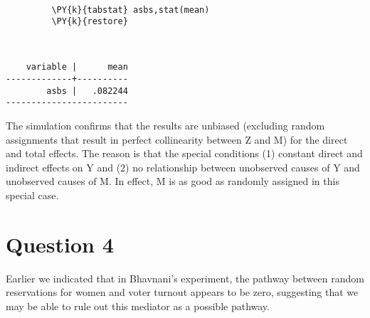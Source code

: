 \documentclass[11pt,notitlepage]{article}\usepackage[]{graphicx}\usepackage[]{color}
\makeatletter
\newenvironment{kframe}{%
 \def\at@end@of@kframe{}%
 \ifinner\ifhmode%
  \def\at@end@of@kframe{\end{minipage}}%
  \begin{minipage}{\columnwidth}%
 \fi\fi%
 \def\FrameCommand##1{\hskip\@totalleftmargin \hskip-\fboxsep
 \colorbox{shadecolor}{##1}\hskip-\fboxsep
     \hskip-\linewidth \hskip-\@totalleftmargin \hskip\columnwidth}%
 \MakeFramed {\advance\hsize-\width
   \@totalleftmargin\z@ \linewidth\hsize
   \@setminipage}}%
 {\par\unskip\endMakeFramed%
 \at@end@of@kframe}
\newenvironment{knitrout}{}{} %
\makeatother
\begin{document}
\begin{enumerate}[a)]
\begin{knitrout}
\begin{kframe}
\begin{Verbatim}[commandchars=\\\{\}]
         
         \PY{k}{tabstat} asbs,stat(mean)
         \PY{k}{restore}
\end{Verbatim}

    \begin{Verbatim}[commandchars=\\\{\}]


    variable |      mean
-------------+----------
        asbs |   .082244
------------------------
    \end{Verbatim}
\end{kframe}
\end{knitrout}


The simulation confirms that the results are unbiased (excluding random assignments that result in perfect collinearity between Z and M) for the direct and total effects.  The reason is that the special conditions (1) constant direct and indirect effects on Y and (2) no relationship between unobserved causes of Y and unobserved causes of M.  In effect, M is as good as randomly assigned in this special case.  

\end{enumerate}


\section*{Question 4}
Earlier we indicated that in Bhavnani's experiment, the pathway between random reservations for women and voter turnout appears to be zero, suggesting that we may be able to rule out this mediator as a possible pathway.
\end{document}
